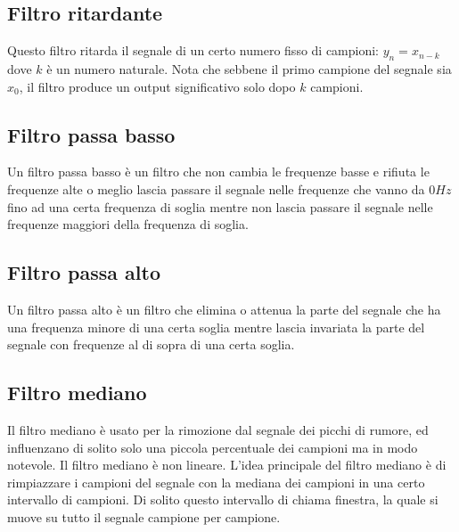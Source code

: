 \subsection{Filtro ritardante}
    Questo filtro ritarda il segnale di un certo numero fisso di campioni: $y_{n} = x_{n-k}$ dove $k$ \`e un numero naturale. Nota che sebbene il primo campione del segnale sia $x_{0}$, il filtro produce un output significativo solo dopo $k$ campioni.

\subsection{Filtro passa basso}%

Un filtro passa basso \`e un filtro che non cambia le frequenze basse e rifiuta le frequenze alte o meglio lascia passare il segnale nelle frequenze che vanno da $0Hz$ fino ad una certa frequenza di soglia mentre non lascia passare il segnale nelle frequenze maggiori della frequenza di soglia.

\subsection{Filtro passa alto}
Un filtro passa alto \`e un filtro che elimina o attenua la parte del segnale che ha una frequenza minore di una certa soglia mentre lascia invariata la parte del segnale con frequenze al di sopra di una certa soglia.





\subsection{Filtro mediano}

Il filtro mediano \`e usato per la rimozione dal segnale dei picchi di rumore, ed influenzano di solito solo una piccola percentuale dei campioni ma in modo notevole. Il filtro mediano \`e non lineare. L'idea principale del filtro mediano \`e di rimpiazzare i campioni del segnale con la mediana dei campioni in una certo intervallo di campioni. Di solito questo intervallo di chiama finestra, la quale si muove su tutto il segnale campione per campione. 


